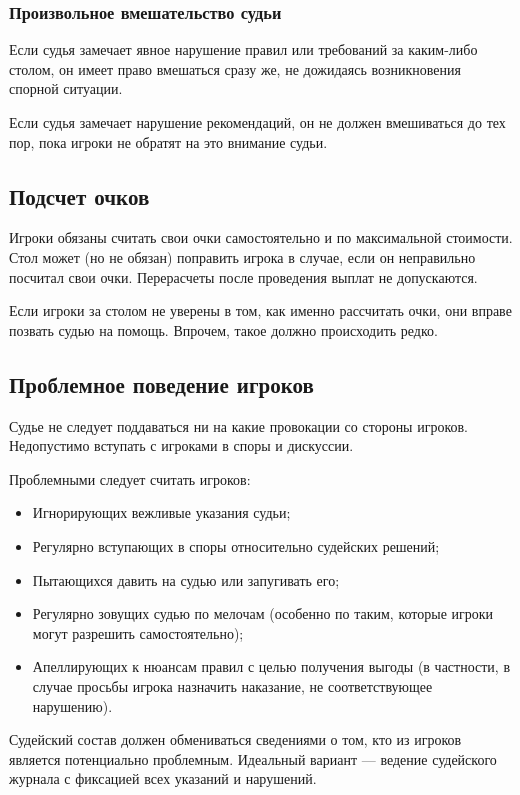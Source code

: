 \subsubsection{Произвольное вмешательство судьи}

Если судья замечает явное нарушение правил или требований за каким-либо столом, он имеет право вмешаться сразу же, не дожидаясь возникновения спорной ситуации.

Если судья замечает нарушение рекомендаций, он не должен вмешиваться до тех пор, пока игроки не обратят на это внимание судьи.

\subsection{Подсчет очков}

Игроки обязаны считать свои очки самостоятельно и по максимальной стоимости. Стол может (но не обязан) поправить игрока в случае, если он неправильно посчитал свои очки. Перерасчеты после проведения выплат не допускаются.

Если игроки за столом не уверены в том, как именно рассчитать очки, они вправе позвать судью на помощь. Впрочем, такое должно происходить редко.

\subsection{Проблемное поведение игроков}

Судье не следует поддаваться ни на какие провокации со стороны игроков. Недопустимо вступать с игроками в споры и дискуссии. 

Проблемными следует считать игроков:
\begin{itemize}
	\item Игнорирующих вежливые указания судьи;
	\item Регулярно вступающих в споры относительно судейских решений;
	\item Пытающихся давить на судью или запугивать его;
	\item Регулярно зовущих судью по мелочам (особенно по таким, которые игроки могут разрешить самостоятельно);
	\item Апеллирующих к нюансам правил с целью получения выгоды (в частности, в случае просьбы игрока назначить наказание, не соответствующее нарушению).
\end{itemize}

Судейский состав должен обмениваться сведениями о том, кто из игроков является потенциально проблемным. Идеальный вариант --- ведение судейского журнала с фиксацией всех указаний и нарушений.

